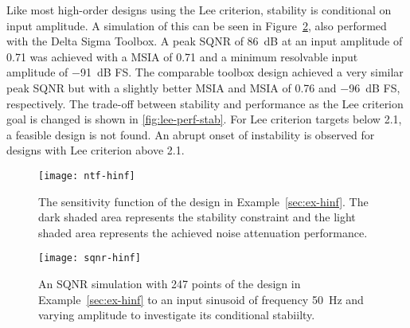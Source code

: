 Like most high-order designs using the Lee criterion, stability is conditional on input amplitude. A simulation of this can be seen in Figure~\ref{fig:sqnr-hinf}, also performed with the Delta Sigma Toolbox. A peak \gls{SQNR} of \SI{86}{\deci\bel} at an input amplitude of 0.71 was achieved with a \gls{MSIA} of 0.71 and a minimum resolvable input amplitude of \SI{-91}{\deci\bel} \gls{FS}. The comparable toolbox design achieved a very similar peak \gls{SQNR} but with a slightly better \gls{MSIA} and \gls{MSIA} of 0.76 and \SI{-96}{\deci\bel} \gls{FS}, respectively. The trade-off between stability and performance as the Lee criterion goal is changed is shown in \autoref{fig:lee-perf-stab}. For Lee criterion targets below 2.1, a feasible design is not found. An abrupt onset of instability is observed for designs with Lee criterion above 2.1.

\begin{figure}
	\texttt{[image: ntf-hinf]}
	\centering
	\caption{The sensitivity function of the design in Example~\ref{sec:ex-hinf}. The dark shaded area represents the stability constraint and the light shaded area represents the achieved noise attenuation performance.} \label{fig:ntf-hinf}
\end{figure}

\begin{figure}
	\texttt{[image: sqnr-hinf]}
	\centering
	\caption{An SQNR simulation with 247 points of the design in Example~\ref{sec:ex-hinf} to an input sinusoid of frequency \SI{50}{\hertz} and varying amplitude to investigate its conditional stabiilty.} \label{fig:sqnr-hinf}
\end{figure}


